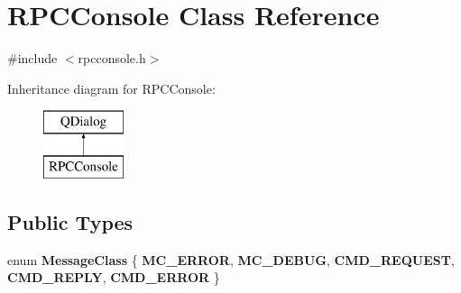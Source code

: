 \hypertarget{class_r_p_c_console}{}\section{R\+P\+C\+Console Class Reference}
\label{class_r_p_c_console}


{\ttfamily \#include $<$rpcconsole.\+h$>$}

Inheritance diagram for R\+P\+C\+Console\+:\begin{figure}[H]
\begin{center}
\leavevmode
\includegraphics[height=2.000000cm]{class_r_p_c_console}
\end{center}
\end{figure}
\subsection*{Public Types}
\begin{DoxyCompactItemize}
\item 
\mbox{\label{class_r_p_c_console_a8924901fe2574698b55f173ef576c83e}} 
enum {\bfseries Message\+Class} \{ \newline
{\bfseries M\+C\+\_\+\+E\+R\+R\+OR}, 
{\bfseries M\+C\+\_\+\+D\+E\+B\+UG}, 
{\bfseries C\+M\+D\+\_\+\+R\+E\+Q\+U\+E\+ST}, 
{\bfseries C\+M\+D\+\_\+\+R\+E\+P\+LY}, 
\newline
{\bfseries C\+M\+D\+\_\+\+E\+R\+R\+OR}
 \}
\end{DoxyCompactItemize}
